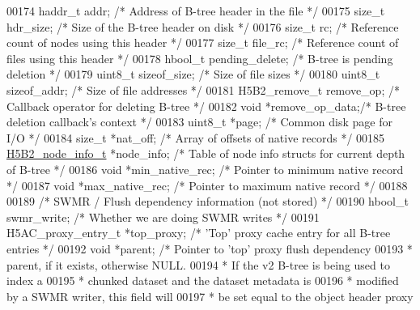 \begin{DoxyCode}
{{00174     haddr\_t     addr;           \textcolor{comment}{/* Address of B-tree header in the file */}
00175     \textcolor{keywordtype}{size\_t}      hdr\_size;       \textcolor{comment}{/* Size of the B-tree header on disk */}
00176     \textcolor{keywordtype}{size\_t}      rc;             \textcolor{comment}{/* Reference count of nodes using this header */}
00177     \textcolor{keywordtype}{size\_t}      file\_rc;        \textcolor{comment}{/* Reference count of files using this header */}
00178     hbool\_t     pending\_delete; \textcolor{comment}{/* B-tree is pending deletion */}
00179     uint8\_t     sizeof\_size;    \textcolor{comment}{/* Size of file sizes */}
00180     uint8\_t     sizeof\_addr;    \textcolor{comment}{/* Size of file addresses */}
00181     H5B2\_remove\_t remove\_op;    \textcolor{comment}{/* Callback operator for deleting B-tree */}
00182     \textcolor{keywordtype}{void}        *remove\_op\_data;\textcolor{comment}{/* B-tree deletion callback's context */}
00183     uint8\_t *page;          \textcolor{comment}{/* Common disk page for I/O */}
00184     \textcolor{keywordtype}{size\_t}      *nat\_off;       \textcolor{comment}{/* Array of offsets of native records */}
00185     \hyperlink{struct_h5_b2__node__info__t}{H5B2\_node\_info\_t} *node\_info; \textcolor{comment}{/* Table of node info structs for current depth of B-tree 
      */}
00186     \textcolor{keywordtype}{void}        *min\_native\_rec; \textcolor{comment}{/* Pointer to minimum native record                  */}
00187     \textcolor{keywordtype}{void}        *max\_native\_rec; \textcolor{comment}{/* Pointer to maximum native record                  */}
00188 
00189     \textcolor{comment}{/* SWMR / Flush dependency information (not stored) */}
00190     hbool\_t     swmr\_write;     \textcolor{comment}{/* Whether we are doing SWMR writes */}
00191     H5AC\_proxy\_entry\_t *top\_proxy;  \textcolor{comment}{/* 'Top' proxy cache entry for all B-tree entries */}
00192     \textcolor{keywordtype}{void}        *parent;        \textcolor{comment}{/* Pointer to 'top' proxy flush dependency}
00193 \textcolor{comment}{                                 * parent, if it exists, otherwise NULL.}
00194 \textcolor{comment}{                                 * If the v2 B-tree is being used to index a}
00195 \textcolor{comment}{                                 * chunked dataset and the dataset metadata is}
00196 \textcolor{comment}{                                 * modified by a SWMR writer, this field will}
00197 \textcolor{comment}{                                 * be set equal to the object header proxy}
}}
\end{DoxyCode}
